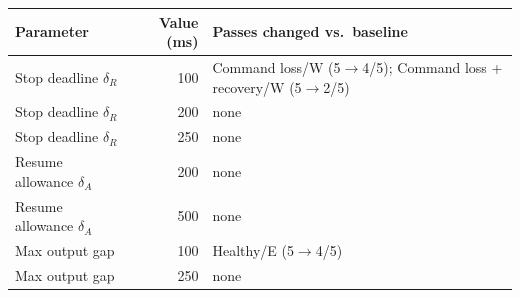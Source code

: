 \begin{tabularx}{\columnwidth}{@{}lrX@{}}
\toprule
Parameter & Value (ms) & Passes changed vs.\ baseline \\
\midrule
Stop deadline $\delta_R$ & 100 & Command loss/W (5$\to$4/5); Command loss + recovery/W (5$\to$2/5) \\
Stop deadline $\delta_R$ & 200 & none \\
Stop deadline $\delta_R$ & 250 & none \\
Resume allowance $\delta_A$ & 200 & none \\
Resume allowance $\delta_A$ & 500 & none \\
Max output gap & 100 & Healthy/E (5$\to$4/5) \\
Max output gap & 250 & none \\
\bottomrule
\end{tabularx}
